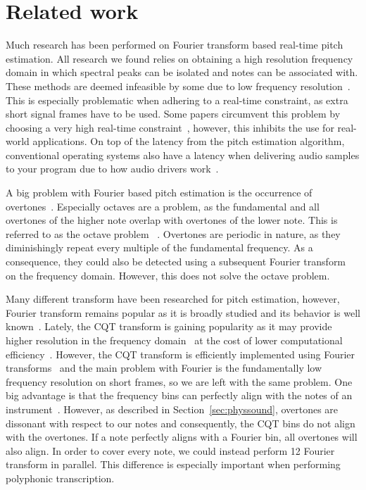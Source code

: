 \documentclass[10pt,twocolumn]{article}
\begin{document}
\section{Related work}  \label{sec:related}
Much research has been performed on Fourier transform based real-time pitch estimation. All research we found relies on obtaining a high resolution frequency domain in which spectral peaks can be isolated and notes can be associated with. These methods are deemed infeasible by some due to low frequency resolution~\cite{fourierlimit}.%
This is especially problematic when adhering to a real-time constraint, as extra short signal frames have to be used. Some papers circumvent this problem by choosing a very high real-time constraint~\cite{sloomboi, sloomboi2}, however, this inhibits the use for real-world applications. On top of the latency from the pitch estimation algorithm, conventional operating systems also have a latency when delivering audio samples to your program due to how audio drivers work~\cite{oslatency}.

A big problem with Fourier based pitch estimation is the occurrence of overtones~\cite{oud}. Especially octaves are a problem, as the fundamental and all overtones of the higher note overlap with overtones of the lower note. This is referred to as the octave problem~
\cite{octave}. Overtones are periodic in nature, as they diminishingly repeat every multiple of the fundamental frequency. As a consequence, they could also be detected using a subsequent Fourier transform~\cite{doublefourier} on the frequency domain. However, this does not solve the octave problem.

Many different transform have been researched for pitch estimation, however, Fourier transform remains popular as it is broadly studied and its behavior is well known~\cite{survey}. Lately, the CQT transform is gaining popularity as it may provide higher resolution in the frequency domain~\cite{cqtres} at the cost of lower computational efficiency~\cite{cqtslow}. However, the CQT transform is efficiently implemented using Fourier transforms~\cite{cqtfft} and the main problem with Fourier is the fundamentally low frequency resolution on short frames, so we are left with the same problem. One big advantage is that the frequency bins can perfectly align with the notes of an instrument~\cite{cqtalign}. However, as described in Section~\ref{sec:physsound}, overtones are dissonant with respect to our notes and consequently, the CQT bins do not align with the overtones. If a note perfectly aligns with a Fourier bin, all overtones will also align. In order to cover every note, we could instead perform 12 Fourier transform in parallel. This difference is especially important when performing polyphonic transcription.
\end{document}
